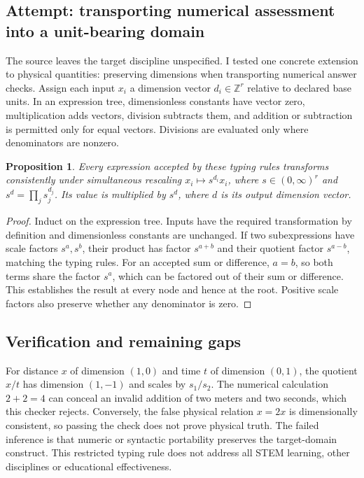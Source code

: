 \documentclass[11pt]{article}
\newtheorem{proposition}{Proposition}
\begin{document}
\subsection{Attempt: transporting numerical assessment into a unit-bearing domain}
The source leaves the target discipline unspecified. I tested one concrete extension to physical quantities: preserving dimensions when transporting numerical answer checks. Assign each input $x_i$ a dimension vector $d_i\in\mathbb Z^r$ relative to declared base units. In an expression tree, dimensionless constants have vector zero, multiplication adds vectors, division subtracts them, and addition or subtraction is permitted only for equal vectors. Divisions are evaluated only where denominators are nonzero.
\begin{proposition}
Every expression accepted by these typing rules transforms consistently under simultaneous rescaling $x_i\mapsto s^{d_i}x_i$, where $s\in(0,\infty)^r$ and $s^d=\prod_j s_j^{d_j}$. Its value is multiplied by $s^d$, where $d$ is its output dimension vector.
\end{proposition}
\begin{proof}
Induct on the expression tree. Inputs have the required transformation by definition and dimensionless constants are unchanged. If two subexpressions have scale factors $s^a,s^b$, their product has factor $s^{a+b}$ and their quotient factor $s^{a-b}$, matching the typing rules. For an accepted sum or difference, $a=b$, so both terms share the factor $s^a$, which can be factored out of their sum or difference. This establishes the result at every node and hence at the root. Positive scale factors also preserve whether any denominator is zero.
\end{proof}
\subsection{Verification and remaining gaps}
For distance $x$ of dimension $(1,0)$ and time $t$ of dimension $(0,1)$, the quotient $x/t$ has dimension $(1,-1)$ and scales by $s_1/s_2$. The numerical calculation $2+2=4$ can conceal an invalid addition of two meters and two seconds, which this checker rejects. Conversely, the false physical relation $x=2x$ is dimensionally consistent, so passing the check does not prove physical truth. The failed inference is that numeric or syntactic portability preserves the target-domain construct. This restricted typing rule does not address all STEM learning, other disciplines or educational effectiveness.
\end{document}
